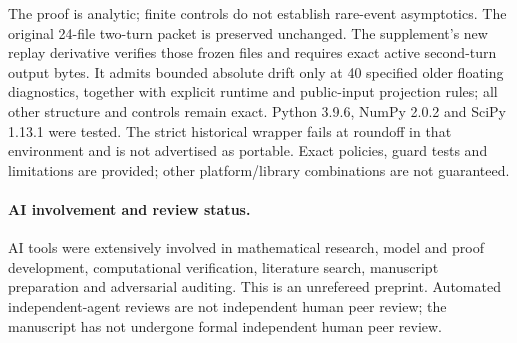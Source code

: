 \documentclass[10pt]{article}
\begin{document}
The proof is analytic; finite controls do not establish rare-event asymptotics.
The original 24-file two-turn packet is preserved unchanged. The supplement's
new replay derivative verifies those frozen files and requires exact active
second-turn output bytes. It admits bounded absolute drift only at 40 specified
older floating diagnostics, together with explicit runtime and public-input
projection rules; all other structure and controls remain exact.
Python 3.9.6, NumPy 2.0.2 and SciPy 1.13.1 were tested.
The strict historical wrapper fails at roundoff in that environment and is
not advertised as portable. Exact policies, guard tests and limitations are
provided; other platform/library combinations are not guaranteed.

\paragraph{AI involvement and review status.}
AI tools were extensively involved in mathematical research, model and proof
development, computational verification, literature search, manuscript
preparation and adversarial auditing. This is an unrefereed preprint.
Automated independent-agent reviews are not independent human peer review;
the manuscript has not undergone formal independent human peer review.
\end{document}
